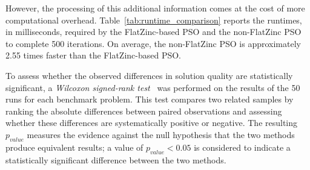 However, the processing of this additional information comes at the cost of more computational overhead. Table~\ref{tab:runtime_comparison} reports the runtimes, in milliseconds, required by the FlatZinc-based PSO and the non-FlatZinc PSO to complete 500 iterations. On average, the non-FlatZinc PSO is approximately 2.55 times faster than the FlatZinc-based PSO.

To assess whether the observed differences in solution quality are statistically significant, a \emph{Wilcoxon signed-rank test}~\cite{woolson2007wilcoxon} was performed on the results of the 50 runs for each benchmark problem. This test compares two related samples by ranking the absolute differences between paired observations and assessing whether these differences are systematically positive or negative. The resulting $p_{value}$ measures the evidence against the null hypothesis that the two methods produce equivalent results; a value of $p_{value}<0.05$ is considered to indicate a statistically significant difference between the two methods. 

